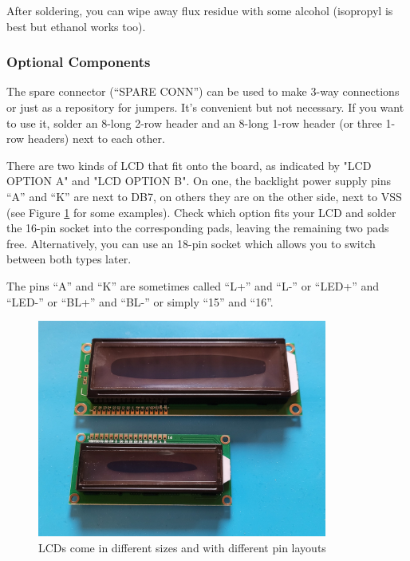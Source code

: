 \documentclass{article}
\newenvironment{note}{\begin{tcolorbox}[colback=blue!5!white,colframe=blue!75!black,title=\textbf{Note}]}{\end{tcolorbox}}
\begin{document}
After soldering, you can wipe away flux residue with some alcohol (isopropyl is best but ethanol works too). 

\subsubsection{Optional Components}\label{sec:compOptional}
The spare connector (``SPARE CONN'') can be used to make 3-way connections or just as a repository for jumpers. It's convenient but not necessary. If you want to use it, solder an 8-long 2-row header and an 8-long 1-row header (or three 1-row headers) next to each other. 

There are two kinds of LCD that fit onto the board, as indicated by "LCD OPTION A" and "LCD OPTION B". On one, the backlight power supply pins ``A'' and ``K'' are next to DB7, on others they are on the other side, next to VSS (see Figure \ref{fig:lcds} for some examples). Check which option fits your LCD and solder the 16-pin socket into the corresponding pads, leaving the remaining two pads free. Alternatively, you can use an 18-pin socket which allows you to switch between both types later. 

\begin{note}
The pins ``A'' and ``K'' are sometimes called ``L+'' and ``L-'' or ``LED+'' and ``LED-'' or ``BL+'' and ``BL-'' or simply ``15'' and ``16''. 
\end{note}

\begin{figure}[htb]
\centering
\includegraphics[width=0.85\textwidth]{Pictures/LCDs.jpg}
\caption{LCDs come in different sizes and with different pin layouts}
\label{fig:lcds}
\end{figure}
\end{document}
